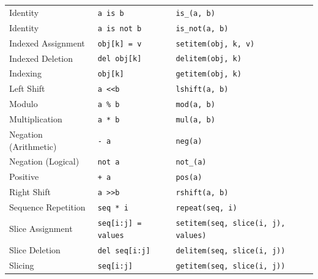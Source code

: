 \documentclass{l4proj}
\begin{document}
\begin{table}[]
\begin{tabular}{@{}lll@{}}
    Identity              & \texttt{a is b}                         & \texttt{is\_(a, b)}                                   \\
    Identity              & \texttt{a is not b}                     & \texttt{is\_not(a, b)}                                \\
    Indexed Assignment    & \texttt{obj{[}k{]} = v}                 & \texttt{setitem(obj, k, v)}                           \\
    Indexed Deletion      & \texttt{del obj{[}k{]}}                 & \texttt{delitem(obj, k)}                              \\
    Indexing              & \texttt{obj{[}k{]}}                     & \texttt{getitem(obj, k)}                              \\
    Left Shift            & \texttt{a \textless{}\textless b}       & \texttt{lshift(a, b)}                                 \\
    Modulo                & \texttt{a \% b}                         & \texttt{mod(a, b)}                                    \\
    Multiplication        & \texttt{a * b}                          & \texttt{mul(a, b)}                                    \\
    Negation (Arithmetic) & \texttt{- a}                            & \texttt{neg(a)}                                       \\
    Negation (Logical)    & \texttt{not a}                          & \texttt{not\_(a)}                                     \\
    Positive              & \texttt{+ a}                            & \texttt{pos(a)}                                       \\
    Right Shift           & \texttt{a \textgreater{}\textgreater b} & \texttt{rshift(a, b)}                                 \\
    Sequence Repetition   & \texttt{seq * i}                        & \texttt{repeat(seq, i)}                               \\
    Slice Assignment      & \texttt{seq{[}i:j{]} = values}          & \texttt{setitem(seq, slice(i, j), values)}            \\
    Slice Deletion        & \texttt{del seq{[}i:j{]}}               & \texttt{delitem(seq, slice(i, j))}                    \\
    Slicing               & \texttt{seq{[}i:j{]}}                   & \texttt{getitem(seq, slice(i, j))}                    \\

\end{tabular}
\end{table}
\end{document}
